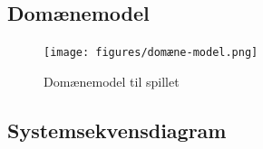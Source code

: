 \documentclass[../main.tex]{subfiles}
\begin{document}
\subsection{Domænemodel}
\begin{figure}[H]
    \centering
    \texttt{[image: figures/domæne-model.png]}
    \caption{Domænemodel til spillet}
    \label{fig:domain}
\end{figure}


\subsection{Systemsekvensdiagram}
\TODO
\end{document}
